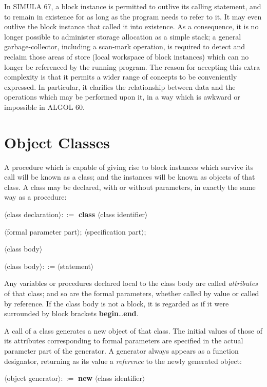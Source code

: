\documentclass[twoside,11pt]{book}
\begin{document}
In SIMULA 67, a block instance is permitted to outlive its calling statement, and to remain in existence for as long as the program needs to refer to it. It may even outlive the block instance that called it into existence. As a consequence, it is no longer possible to administer storage allocation as a simple stack; a general garbage-collector, including a scan-mark operation, is required to detect and reclaim those areas of store (local workspace of block instances) which can no longer be referenced by the running program. The reason for accepting this extra complexity is that it permits a wider range of concepts to be conveniently expressed. In particular, it clarifies the relationship between data and the operations which may be performed upon it, in a way which is awkward or impossible in ALGOL 60.

\section[Object classes]{Object Classes}

A procedure which is capable of giving rise to block instances which survive its call will be known as a class; and the instances will be known as objects of that class. A class may be declared, with or without parameters, in exactly the same way as a procedure: 

\quad $\langle$class declaration$\rangle ::=$ \textbf{class} $\langle$class identifier$\rangle$

\tabto*{11.6em}$\langle$formal parameter part$\rangle$; $\langle$specification part$\rangle$;

\tabto*{11.6em}$\langle$class body$\rangle$

\quad $\langle$class body$\rangle ::= \langle$statement$\rangle$

Any variables or procedures declared local to the class body are called \textit{attributes} of that class; and so are the formal parameters, whether called by
value or called by reference. If the class body is not a block, it is regarded as if it were surrounded by block brackets \textbf{begin}\dots\textbf{end}.

A call of a class generates a new object of that class. The initial values of those of its attributes corresponding to formal parameters are specified in the actual parameter part of the generator. A generator always appears as a function designator, returning as its value a \textit{reference} to the newly generated object:

\quad $\langle$object generator$\rangle ::=$ \textbf{new} $\langle$class identifier$\rangle$
\end{document}
